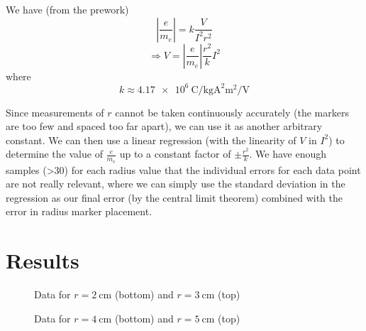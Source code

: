 \documentclass[a4paper]{scrartcl}
\begin{document}
We have (from the prework)
\[\left|\frac{e}{m_e}\right| = k \frac{V}{I^2 r^2}\]
\[\Rightarrow V = \left|\frac{e}{m_e}\right| \frac{r^2}{k} I^2\]
where
\[k \approx \SI{4.17e6}{\coulomb\per\kilo\gram\ampere\squared\metre\squared\per\volt}\]

Since measurements of \(r\) cannot be taken continuously accurately (the markers are too few and spaced too far apart), we can use it as another arbitrary constant. We can then use a linear regression (with the linearity of \(V\) in \(I^2\)) to determine the value of \(\frac{e}{m_e}\) up to a constant factor of \(\pm\frac{r^2}{k}\). We have enough samples (>30) for each radius value that the individual errors for each data point are not really relevant, where we can simply use the standard deviation in the regression as our final error (by the central limit theorem) combined with the error in radius marker placement.

\section{Results}
\begin{figure}
    \centering
    \caption{Data for \(r = \SI{2}{\centi\metre}\) (bottom) and \(r = \SI{3}{\centi\metre}\) (top)}
    \label{fig:data-1}
\end{figure}

\begin{figure}
    \centering
    \caption{Data for \(r = \SI{4}{\centi\metre}\) (bottom) and \(r = \SI{5}{\centi\metre}\) (top)}
    \label{fig:data-2}
\end{figure}
\end{document}
